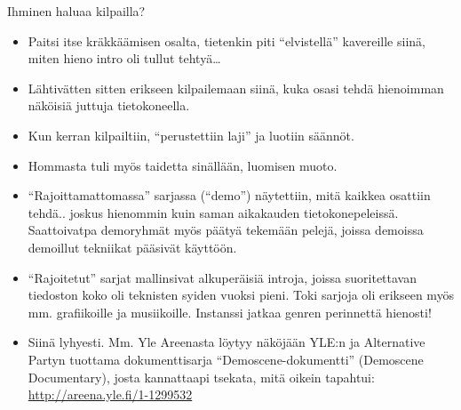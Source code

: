 \documentclass[pdf,10pt,handout]{beamer}
\begin{document}
\begin{frame}{Ihminen haluaa kilpailla?}
  \begin{itemize}
  \item Paitsi itse kräkkäämisen osalta, tietenkin piti
    ``elvistellä'' kavereille siinä, miten hieno intro oli tullut
    tehtyä\ldots
  \item Lähtivätten sitten erikseen kilpailemaan siinä, kuka osasi
    tehdä hienoimman näköisiä juttuja tietokoneella.
  \item Kun kerran kilpailtiin, ``perustettiin laji'' ja luotiin
    säännöt.
  \item Hommasta tuli myös taidetta sinällään, luomisen muoto.
  \item ``Rajoittamattomassa'' sarjassa (``demo'') näytettiin, mitä
    kaikkea osattiin tehdä.. joskus hienommin kuin saman aikakauden
    tietokonepeleissä. Saattoivatpa demoryhmät myös päätyä tekemään
    pelejä, joissa demoissa demoillut tekniikat pääsivät käyttöön.
  \item ``Rajoitetut'' sarjat mallinsivat alkuperäisiä introja, joissa
    suoritettavan tiedoston koko oli teknisten syiden vuoksi
    pieni. Toki sarjoja oli erikseen myös mm. grafiikoille ja
    musiikoille. Instanssi jatkaa genren perinnettä hienosti!
  \item Siinä lyhyesti. Mm. Yle Areenasta löytyy näköjään YLE:n ja
    Alternative Partyn tuottama dokumenttisarja
    ``Demoscene-dokumentti'' (Demoscene Documentary), josta
    kannattaapi tsekata, mitä oikein tapahtui:
    \url{http://areena.yle.fi/1-1299532}
  \end{itemize}
\end{frame}
\end{document}

